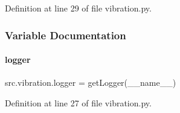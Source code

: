 Definition at line 29 of file vibration.\+py.



\subsubsection{Variable Documentation}
\mbox{\label{namespacesrc_1_1vibration_a649ca5a0df765b34d4e7e7e71110acf8}} 
\paragraph{\texorpdfstring{logger}{logger}}
{\footnotesize\ttfamily src.\+vibration.\+logger = get\+Logger(\+\_\+\+\_\+name\+\_\+\+\_\+)}



Definition at line 27 of file vibration.\+py.

